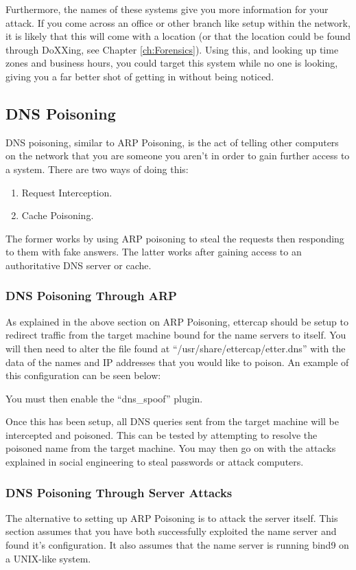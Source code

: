 				Furthermore, the names of these systems give you more information for your attack.
				If you come across an office or other branch like setup within the network, it is likely that this will come with a location (or that the location could be found through DoXXing, see Chapter \ref{ch:Forensics}).
				Using this, and looking up time zones and business hours, you could target this system while no one is looking,
				giving you a far better shot of getting in without being noticed.

		\subsection{DNS Poisoning}
			DNS poisoning, similar to ARP Poisoning, is the act of telling other computers on the network that you are someone you aren't in order to gain further access to a system.
			There are two ways of doing this:
			\begin{enumerate}
				\item Request Interception.
				\item Cache Poisoning.
			\end{enumerate}
			The former works by using ARP poisoning to steal the requests then responding to them with fake answers.
			The latter works after gaining access to an authoritative DNS server or cache.

			\subsubsection{DNS Poisoning Through ARP}
				As explained in the above section on ARP Poisoning, ettercap should be setup to redirect traffic from the target machine bound for the name servers to itself.
				You will then need to alter the file found at ``/usr/share/ettercap/etter.dns'' with the data of the names and IP addresses that you would like to poison.
				An example of this configuration can be seen below:
				
				You must then enable the ``dns\_spoof'' plugin.

				Once this has been setup, all DNS queries sent from the target machine will be intercepted and poisoned.
				This can be tested by attempting to resolve the poisoned name from the target machine.
				You may then go on with the attacks explained in social engineering to steal passwords or attack computers.
			\subsubsection{DNS Poisoning Through Server Attacks}
				The alternative to setting up ARP Poisoning is to attack the server itself.
				This section assumes that you have both successfully exploited the name server and found it's configuration.
				It also assumes that the name server is running bind9 on a UNIX-like system.

